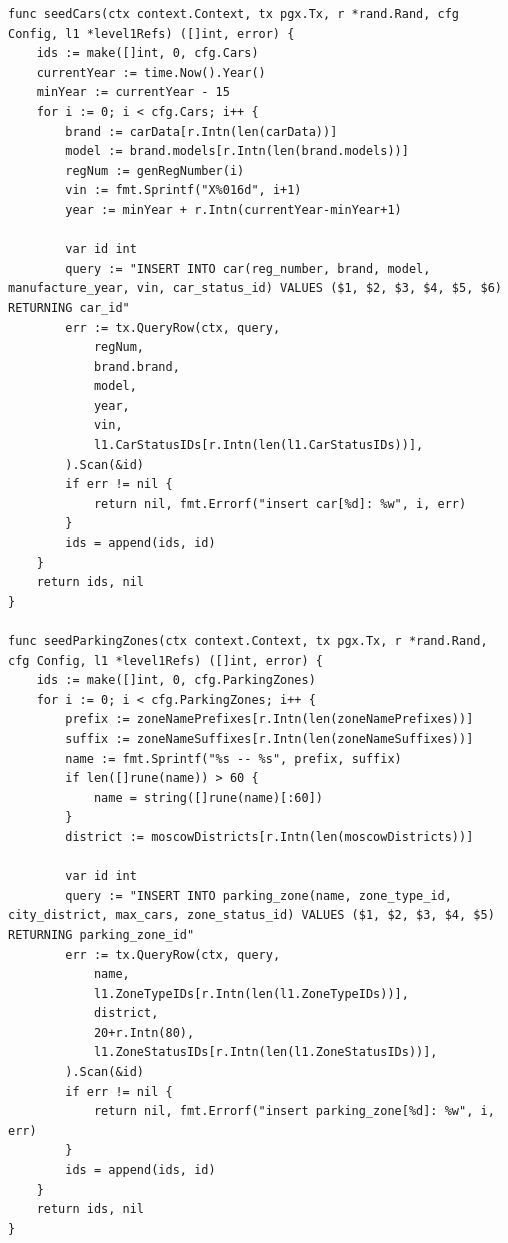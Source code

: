 \begin{lstlisting}[style=gostyle, caption={Заполнение основных сущностей (internal/seeder/level2.go)}, label={lst:goLevel2}]
func seedCars(ctx context.Context, tx pgx.Tx, r *rand.Rand, cfg Config, l1 *level1Refs) ([]int, error) {
	ids := make([]int, 0, cfg.Cars)
	currentYear := time.Now().Year()
	minYear := currentYear - 15
	for i := 0; i < cfg.Cars; i++ {
		brand := carData[r.Intn(len(carData))]
		model := brand.models[r.Intn(len(brand.models))]
		regNum := genRegNumber(i)
		vin := fmt.Sprintf("X%016d", i+1)
		year := minYear + r.Intn(currentYear-minYear+1)

		var id int
		query := "INSERT INTO car(reg_number, brand, model, manufacture_year, vin, car_status_id) VALUES ($1, $2, $3, $4, $5, $6) RETURNING car_id"
		err := tx.QueryRow(ctx, query,
			regNum,
			brand.brand,
			model,
			year,
			vin,
			l1.CarStatusIDs[r.Intn(len(l1.CarStatusIDs))],
		).Scan(&id)
		if err != nil {
			return nil, fmt.Errorf("insert car[%d]: %w", i, err)
		}
		ids = append(ids, id)
	}
	return ids, nil
}

func seedParkingZones(ctx context.Context, tx pgx.Tx, r *rand.Rand, cfg Config, l1 *level1Refs) ([]int, error) {
	ids := make([]int, 0, cfg.ParkingZones)
	for i := 0; i < cfg.ParkingZones; i++ {
		prefix := zoneNamePrefixes[r.Intn(len(zoneNamePrefixes))]
		suffix := zoneNameSuffixes[r.Intn(len(zoneNameSuffixes))]
		name := fmt.Sprintf("%s -- %s", prefix, suffix)
		if len([]rune(name)) > 60 {
			name = string([]rune(name)[:60])
		}
		district := moscowDistricts[r.Intn(len(moscowDistricts))]

		var id int
		query := "INSERT INTO parking_zone(name, zone_type_id, city_district, max_cars, zone_status_id) VALUES ($1, $2, $3, $4, $5) RETURNING parking_zone_id"
		err := tx.QueryRow(ctx, query,
			name,
			l1.ZoneTypeIDs[r.Intn(len(l1.ZoneTypeIDs))],
			district,
			20+r.Intn(80),
			l1.ZoneStatusIDs[r.Intn(len(l1.ZoneStatusIDs))],
		).Scan(&id)
		if err != nil {
			return nil, fmt.Errorf("insert parking_zone[%d]: %w", i, err)
		}
		ids = append(ids, id)
	}
	return ids, nil
}
\end{lstlisting}
\newpage

